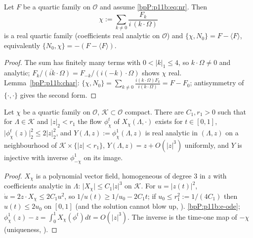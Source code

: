 \begin{lemma}\label{bpP:p11b:homological}
Let $F$ be a quartic family on $\mathcal O$ and assume \eqref{bpP:p11b:eq:nr}. Then
\[\chi:=\sum_{k\ne0}\frac{F_k}{i\,(k\cdot\Omega)}\]
is a real quartic family (coefficients real analytic on $\mathcal O$) and $\{\chi,N_0\}=F-\langle F\rangle$, equivalently $\{N_0,\chi\}=-(F-\langle F\rangle)$.
\end{lemma}
\begin{proof}
\label{stepP:p11b:ho-def} The sum has finitely many terms with $0<\lvert k\rvert_1\le4$, so $k\cdot\Omega\ne0$ and analytic; $\overline{F_k/(i k\cdot\Omega)}=F_{-k}/(i(-k)\cdot\Omega)$ shows $\chi$ real.
\label{stepP:p11b:ho-eq} Lemma~\ref{bpP:p11b:char}: $\{\chi,N_0\}=\sum_{k\ne0}\frac{i(k\cdot\Omega)F_k}{i(k\cdot\Omega)}=F-F_0$; antisymmetry of $\{\cdot,\cdot\}$ gives the second form.
\end{proof}

\begin{lemma}\label{bpP:p11b:flow}
Let $\chi$ be a quartic family on $\mathcal O$, $\mathcal K\subset\mathcal O$ compact. There are $C_1,r_1>0$ such that for $\Lambda\in\mathcal K$ and $\lvert z\rvert_2<r_1$ the flow $\phi_\chi^t$ of $X_\chi(\Lambda,\cdot)$ exists for $t\in[0,1]$, $\lvert\phi^t_\chi(z)\rvert_2^2\le2\lvert z\rvert_2^2$, and $Y(\Lambda,z):=\phi_\chi^1(\Lambda,z)$ is real analytic in $(\Lambda,z)$ on a neighbourhood of $\mathcal K\times\{|z|<r_1\}$, $Y(\Lambda,z)=z+O(\lvert z\rvert^3)$ uniformly, and $Y$ is injective with inverse $\phi^1_{-\chi}$ on its image.
\end{lemma}
\begin{proof}
\label{stepP:p11b:fl-bd} $X_\chi$ is a polynomial vector field, homogeneous of degree $3$ in $z$ with coefficients analytic in $\Lambda$: $\lvert X_\chi\rvert\le C_1\lvert z\rvert^3$ on $\mathcal K$. For $u=\lvert z(t)\rvert^2$, $\dot u=2z\cdot X_\chi\le2C_1u^2$, so $1/u(t)\ge1/u_0-2C_1t$; if $u_0\le r_1^2:=1/(4C_1)$ then $u(t)\le2u_0$ on $[0,1]$ (and the solution cannot blow up, ).
\label{stepP:p11b:fl-an} \ref{bpP:p11b:e-ode}; $\phi^1_\chi(z)-z=\int_0^1X_\chi(\phi^t)dt=O(\lvert z\rvert^3)$. The inverse is the time-one map of $-\chi$ (uniqueness, ).
\end{proof}

